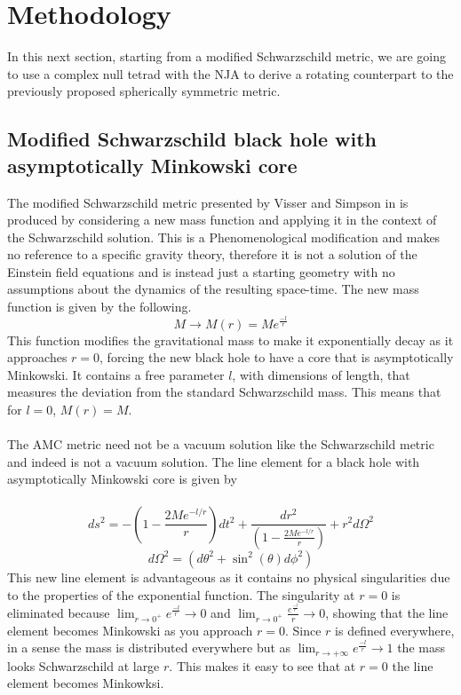 \documentclass[12pt]{iopart}
\begin{document}
\section{Methodology}
In this next section, starting from a modified Schwarzschild metric, we are going to use a complex null tetrad with the NJA to derive a rotating counterpart to the previously proposed spherically symmetric metric.
\subsection{Modified Schwarzschild black hole with asymptotically Minkowski core}
The modified Schwarzschild metric presented by Visser and Simpson in \cite{Simpson:2019mud} is produced by considering a new mass function and applying it in the context of the Schwarzschild solution. This is a Phenomenological modification and makes no reference to a specific gravity theory, therefore it is not a solution of the Einstein field equations and is instead just a starting geometry with no assumptions about the dynamics of the resulting space-time. The new mass function is given by the following.
\begin{equation}
M \rightarrow M(r) = Me^{\frac{-l}{r}}
\end{equation}
This function modifies the gravitational mass to make it exponentially decay as it approaches $r=0$, forcing the new black hole to have a core that is asymptotically Minkowski.  It contains a free parameter $l$, with dimensions of length, that measures the deviation from the standard Schwarzschild mass. This means that for $l=0$, $M(r) = M$.
\\
\\
The AMC metric need not be a vacuum solution like the Schwarzschild metric and indeed is not a vacuum solution. The line element for a black hole with asymptotically Minkowski core is given by 
\\
\\
\begin{equation}
ds^2 = -\left(1-\frac{2Me^{-l/r}}{r}\right)dt^2 + \frac{dr^2}{\left(1-\frac{2Me^{-l/r}}{r}\right)}+r^2d\Omega^2 
\end{equation}
\begin{equation}
d\Omega^2 = (d\theta^2+\sin^2(\theta)d\phi^2)
\end{equation}
This new line element is advantageous as it contains no physical singularities due to the properties of the exponential function. The singularity at $r=0$ is eliminated because $\lim_{r\to 0^+} e^{\frac{-l}{r}} \rightarrow 0$  and $\lim_{r\to 0^+} \frac{e^{\frac{-l}{r}}}{r} \rightarrow 0$, showing that the line element becomes Minkowski as you approach $r=0$. Since $r$ is defined everywhere, in a sense the mass is distributed everywhere but as $\lim_{r\to +\infty} e^{\frac{-l}{r}} \rightarrow 1$ the mass looks Schwarzschild at large $r$. This makes it easy to see that at $r=0$ the line element becomes Minkowksi.
\\
\\
\end{document}
